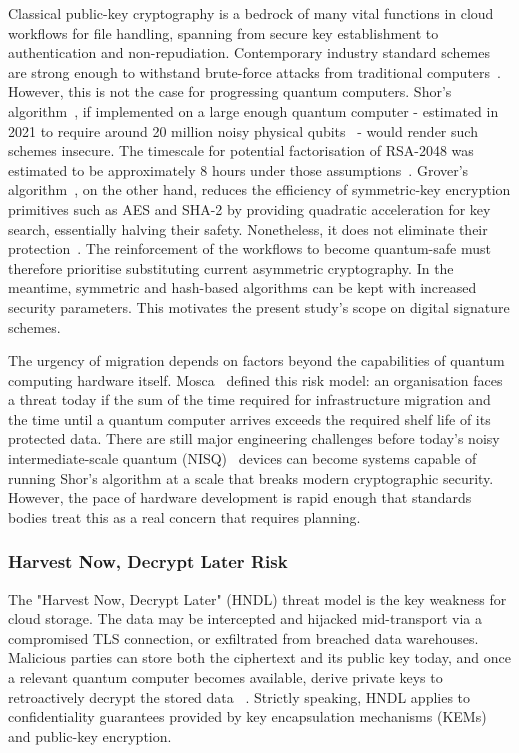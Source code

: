 \documentclass[12pt,a4paper]{article}
\begin{document}
Classical public-key cryptography is a bedrock of many vital functions in cloud workflows for file handling, spanning from secure key establishment to authentication and non-repudiation. Contemporary industry standard schemes are strong enough to withstand brute-force attacks from traditional computers~\cite{nist-fips-186-5-2023}. However, this is not the case for progressing quantum computers. Shor's algorithm~\cite{shor1997}, if implemented on a large enough quantum computer - estimated in 2021 to require around 20 million noisy physical qubits~\cite{gidney-ekera-2021} - would render such schemes insecure. The timescale for potential factorisation of RSA-2048 was estimated to be approximately 8 hours under those assumptions~\cite{gidney-ekera-2021}. Grover's algorithm~\cite{grover1996}, on the other hand, reduces the efficiency of symmetric-key encryption primitives such as AES and SHA-2 by providing quadratic acceleration for key search, essentially halving their safety. Nonetheless, it does not eliminate their protection~\cite{grover1996,nist-sp800-131a-2019}. The reinforcement of the workflows to become quantum-safe must therefore prioritise substituting current asymmetric cryptography. In the meantime, symmetric and hash-based algorithms can be kept with increased security parameters. This motivates the present study's scope on digital signature schemes.

The urgency of migration depends on factors beyond the capabilities of quantum computing hardware itself. Mosca~\cite{mosca2018} defined this risk model: an organisation faces a threat today if the sum of the time required for infrastructure migration and the time until a quantum computer arrives exceeds the required shelf life of its protected data. There are still major engineering challenges before today’s noisy intermediate-scale quantum (NISQ)~\cite{preskill2018} devices can become systems capable of running Shor’s algorithm at a scale that breaks modern cryptographic security. However, the pace of hardware development is rapid enough that standards bodies treat this as a real concern that requires planning.

\subsubsection{Harvest Now, Decrypt Later Risk}

The "Harvest Now, Decrypt Later" (HNDL) threat model is the key weakness for cloud storage. The data may be intercepted and hijacked mid-transport via a compromised TLS connection, or exfiltrated from breached data warehouses. Malicious parties can store both the ciphertext and its public key today, and once a relevant quantum computer becomes available, derive private keys to retroactively decrypt the stored data ~\cite{sectigo-hndl-2025,hashicorp-hndl-2025}. Strictly speaking, HNDL applies to confidentiality guarantees provided by key encapsulation mechanisms (KEMs) and public-key encryption. 
\end{document}

